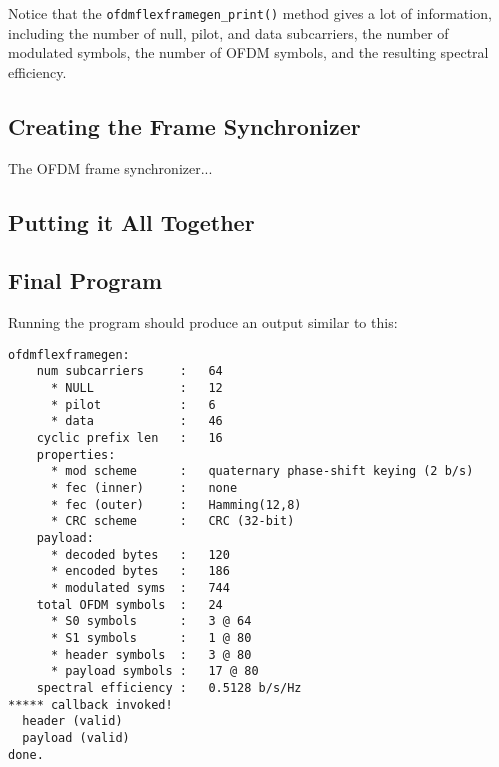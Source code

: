 %
Notice that the {\tt ofdmflexframegen\_print()} method gives a lot of
information, including
the number of null, pilot, and data subcarriers,
the number of modulated symbols,
the number of OFDM symbols,
and the resulting spectral efficiency.

%
%
\subsection{Creating the Frame Synchronizer}
\label{tutorial:ofdmflexframe:framesync}
The OFDM frame synchronizer...

%
%
\subsection{Putting it All Together}
\label{tutorial:ofdmflexframe:xxx}

%
%
\subsection{Final Program}
\label{tutorial:ofdmflexframe:completed}

%

%
Running the program should produce an output similar to this:
%
\begin{Verbatim}[fontsize=\small]
ofdmflexframegen:
    num subcarriers     :   64
      * NULL            :   12
      * pilot           :   6
      * data            :   46
    cyclic prefix len   :   16
    properties:
      * mod scheme      :   quaternary phase-shift keying (2 b/s)
      * fec (inner)     :   none
      * fec (outer)     :   Hamming(12,8)
      * CRC scheme      :   CRC (32-bit)
    payload:
      * decoded bytes   :   120
      * encoded bytes   :   186
      * modulated syms  :   744
    total OFDM symbols  :   24
      * S0 symbols      :   3 @ 64
      * S1 symbols      :   1 @ 80
      * header symbols  :   3 @ 80
      * payload symbols :   17 @ 80
    spectral efficiency :   0.5128 b/s/Hz
***** callback invoked!
  header (valid)
  payload (valid)
done.
\end{Verbatim}
%
